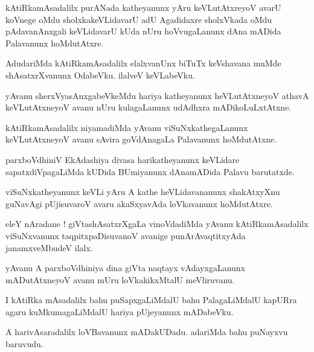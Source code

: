 \documentclass{article}
\begin{document}
\begin{mn}%
kAtiRkamAsadalilx purANada katheyanunx yAru keVLutAtxreyoV avarU koVnege oMdu sholxkakeVLidavarU 
adU Agadidaxre sholxVkada oMdu pAdavanAnxgali keVLidavarU kUda nUru hoVvugaLanunx dAna mADida 
Palavanunx hoMdutAtxre.
\end{mn}

\begin{mn}%
AdudariMda kAtiRkamAsadalilx elalxvanUnx biTuTx keVshavana muMde shAsatxrXvanunx OdabeVku. ilalveV 
keVLabeVku.
\end{mn}

\begin{mn}%
yAvanu sherxVyasAnxgabeVkeMdu hariya katheyanunx heVLutAtxneyoV athavA keVLutAtxneyoV avanu nUru 
kulagaLanunx udAdhxra mADikoLuLxtAtxne.
\end{mn}

\begin{mn}%
kAtiRkamAsadalilx niyamadiMda yAvanu viSuNxkathegaLanunx keVLutAtxneyoV avanu sAvira goVdAnagaLa 
Palavanunx hoMdutAtxne.
\end{mn}

\begin{mn}%
parxboVdhiniV EkAdashiya divasa harikatheyanunx keVLidare sapatxdiVpagaLiMda kUDida BUmiyanunx 
dAnamADida Palavu barutatxde.
\end{mn}

\begin{mn}%
viSuNxkatheyanunx keVLi yAru A kathe heVLidavananunx shakAtxyXnu guNavAgi pUjisuvaroV avaru 
akaSxyavAda loVkavanunx hoMdutAtxre.
\end{mn}

\begin{mn}%
eleY nAradane ! giVtashAsatxrXgaLa vinoVdadiMda yAvanu kAtiRkamAsadalilx viSuNxvanunx 
taqpitxpaDisuvanoV avanige punArAvaqtitxyAda janamxveMbudeV ilalx.
\end{mn}

\begin{mn}%
yAvanu A parxboVdhiniya dina giVta naqtayx vAdayxgaLanunx mADutAtxneyoV avanu mUru loVkakikxMtalU 
meVliruvanu.
\end{mn}

\begin{mn}%
I kAtiRka mAsadalilx bahu puSapxgaLiMdalU bahu PalagaLiMdalU kapURra agaru kuMkumagaLiMdalU hariya 
pUjeyanunx mADabeVku.
\end{mn}

\begin{mn}%
A harivAsaradalilx loVBavanunx mADakUDadu. adariMda bahu puNayxvu baruvudu.
\end{mn}
\end{document}
